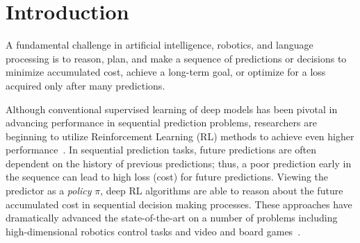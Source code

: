 \documentclass{article}
\begin{document}



\section{Introduction}
A fundamental challenge in artificial intelligence, robotics, and language processing is to reason, plan, and make a sequence of predictions or decisions to minimize accumulated cost, achieve a long-term goal, or optimize for a loss acquired only after many predictions. 

Although conventional supervised learning of deep models has been pivotal in advancing performance in sequential prediction problems, researchers are beginning to utilize Reinforcement Learning (RL) methods to achieve even higher performance~\cite{ranzato2015sequence,bahdanau2016actor,li2016deep}. In sequential prediction tasks, future predictions %
are often dependent on the history of previous predictions; thus, a poor prediction early in the sequence can lead to high loss (cost) for future predictions. 
Viewing the predictor as a \emph{policy} $\pi$, deep RL algorithms are able to reason about the future accumulated cost in sequential decision making processes. These approaches have dramatically advanced the state-of-the-art on a number of problems including high-dimensional robotics control tasks and video and board games~\cite{schulman2015trust,silver2016mastering}.
\end{document}
